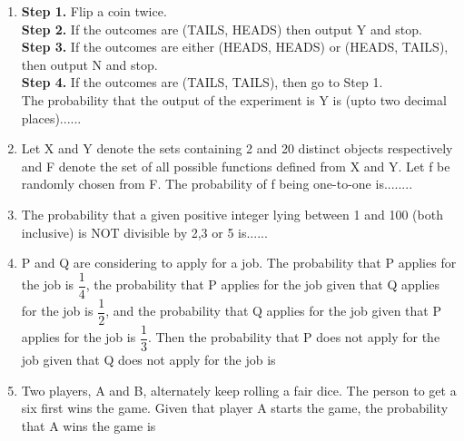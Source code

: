 \documentclass[journal,12pt,twocolumn]{IEEEtran}
\begin{document}
\begin{enumerate}
\item \textbf{Step 1.} Flip a coin twice.\\
\textbf{Step 2.} If the outcomes are (TAILS, HEADS) then output Y and stop.\\
\textbf{Step 3.} If the outcomes are either (HEADS, HEADS) or (HEADS, TAILS), then output N and stop.\\
\textbf{Step 4.} If the outcomes are (TAILS, TAILS), then go to Step 1.\\
The probability that the output of the experiment is Y is (upto two decimal places)......


\item Let X and Y denote the sets containing 2 and 20 distinct objects respectively and F denote the set of all possible functions defined from X and Y. Let f be randomly chosen from F. The probability of f being one-to-one is........

\item The probability that a given positive integer lying between 1 and 100 (both inclusive) is NOT divisible by 2,3 or 5 is......
\\
\solution


\item P and Q are considering to apply for a job. The probability that P applies for the job is $\dfrac{1}{4}$, the probability that P applies for the job given that Q applies for the job is $\dfrac{1}{2}$, and the probability that Q applies for the job given that P applies for the job is $\dfrac{1}{3}$. Then the probability that P does not apply for the job given that Q does not apply for the job is 

\begin{enumerate}
\end{enumerate}
\solution


\item Two players, A and B, alternately keep rolling a fair dice. The person to get a six first wins the game. Given that player A starts the game, the probability that A wins the game is


\end{enumerate}
\end{document}
